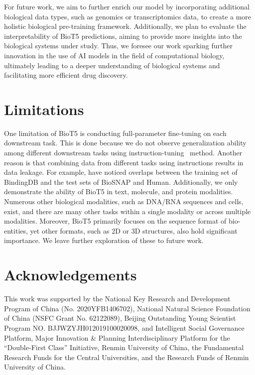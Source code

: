 \documentclass[11pt]{article}
\newcommand{\method}{{BioT5}}
\begin{document}
For future work, we aim to further enrich our model by incorporating additional biological data types, such as genomics or transcriptomics data, to create a more holistic biological pre-training framework. 
Additionally, we plan to evaluate the interpretability of \method{} predictions, aiming to provide more insights into the biological systems under study. 
Thus, we foresee our work sparking further innovation in the use of AI models in the field of computational biology, ultimately leading to a deeper understanding of biological systems and facilitating more efficient drug discovery.

\section{Limitations}
One limitation of \method{} is conducting full-parameter fine-tuning on each downstream task. 
This is done because we do not observe generalization ability among different downstream tasks using instruction-tuning~\citep{DBLP:conf/iclr/WeiBZGYLDDL22} method.
Another reason is that combining data from different tasks using instructions results in data leakage. 
For example, have noticed overlaps between the training set of BindingDB and the test sets of BioSNAP and Human.
Additionally, we only demonstrate the ability of \method{} in text, molecule, and protein modalities. 
Numerous other biological modalities, such as DNA/RNA sequences and cells, exist, and there are many other tasks within a single modality or across multiple modalities.
Moreover, \method{} primarily focuses on the sequence format of bio-entities, yet other formats, such as 2D or 3D structures, also hold significant importance.
We leave further exploration of these to future work.

\section{Acknowledgements}
This work was supported by the National Key Research and Development Program of China (No. 2020YFB1406702), National Natural Science Foundation of China (NSFC Grant No. 62122089), Beijing Outstanding Young Scientist Program NO. BJJWZYJH012019100020098, and Intelligent Social Governance Platform, Major Innovation \& Planning Interdisciplinary Platform for the ``Double-First Class'' Initiative, Renmin University of China, the Fundamental Research Funds for the Central Universities, and the Research Funds of Renmin University of China. 



\end{document}
